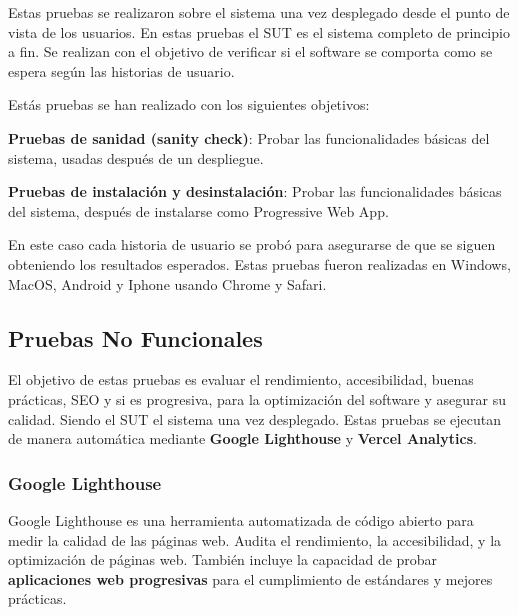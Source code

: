 \documentclass[12pt,twoside,titlepage]{report}
\begin{document}
Estas pruebas se realizaron sobre el sistema una vez desplegado desde el punto de vista de los usuarios. En estas pruebas el SUT es el sistema completo de principio a fin. Se realizan con el objetivo de verificar si el software se comporta como se espera según las historias de usuario.

Estás pruebas se han realizado con los siguientes objetivos:

\begin{compactitem}
    \item \textbf{Pruebas de sanidad (sanity check)}: Probar las funcionalidades básicas del sistema, usadas después de un despliegue.
    \item \textbf{Pruebas de instalación y desinstalación}: Probar las funcionalidades básicas del sistema, después de instalarse como Progressive Web App.
\end{compactitem}

En este caso cada historia de usuario se probó para asegurarse de que se siguen obteniendo los resultados esperados. Estas pruebas fueron realizadas en Windows, MacOS, Android y Iphone usando Chrome y Safari.

\subsection{Pruebas No Funcionales}

El objetivo de estas pruebas es evaluar el rendimiento, accesibilidad, buenas prácticas, SEO y si es progresiva, para la optimización del software y asegurar su calidad. Siendo el SUT el sistema una vez desplegado. Estas pruebas se ejecutan de manera automática mediante \textbf{Google Lighthouse} y \textbf{Vercel Analytics}.

\subsubsection{Google Lighthouse}

Google Lighthouse es una herramienta automatizada de código abierto para medir la calidad de las páginas web. Audita el rendimiento, la accesibilidad, y la optimización de páginas web.
También incluye la capacidad de probar \textbf{aplicaciones web progresivas} para el cumplimiento de estándares y mejores prácticas.

\end{document}
